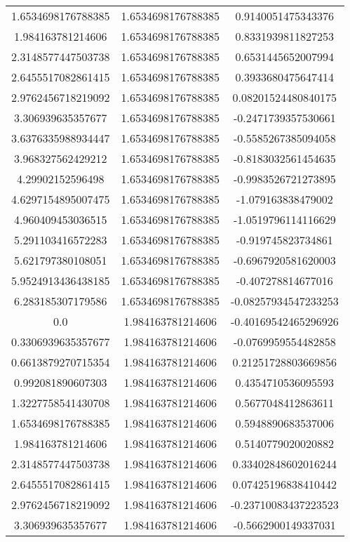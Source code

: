 \begin{table}
\begin{tabular}{ccc}
1.6534698176788385 & 1.6534698176788385 & 0.9140051475343376 \\
1.984163781214606 & 1.6534698176788385 & 0.8331939811827253 \\
2.3148577447503738 & 1.6534698176788385 & 0.6531445652007994 \\
2.6455517082861415 & 1.6534698176788385 & 0.3933680475647414 \\
2.9762456718219092 & 1.6534698176788385 & 0.08201524480840175 \\
3.306939635357677 & 1.6534698176788385 & -0.2471739357530661 \\
3.6376335988934447 & 1.6534698176788385 & -0.5585267385094058 \\
3.968327562429212 & 1.6534698176788385 & -0.8183032561454635 \\
4.29902152596498 & 1.6534698176788385 & -0.9983526721273895 \\
4.6297154895007475 & 1.6534698176788385 & -1.079163838479002 \\
4.960409453036515 & 1.6534698176788385 & -1.0519796114116629 \\
5.291103416572283 & 1.6534698176788385 & -0.919745823734861 \\
5.621797380108051 & 1.6534698176788385 & -0.6967920581620003 \\
5.9524913436438185 & 1.6534698176788385 & -0.407278814677016 \\
6.283185307179586 & 1.6534698176788385 & -0.08257934547233253 \\
0.0 & 1.984163781214606 & -0.40169542465296926 \\
0.3306939635357677 & 1.984163781214606 & -0.0769959554482858 \\
0.6613879270715354 & 1.984163781214606 & 0.21251728803669856 \\
0.992081890607303 & 1.984163781214606 & 0.4354710536095593 \\
1.3227758541430708 & 1.984163781214606 & 0.5677048412863611 \\
1.6534698176788385 & 1.984163781214606 & 0.5948890683537006 \\
1.984163781214606 & 1.984163781214606 & 0.5140779020020882 \\
2.3148577447503738 & 1.984163781214606 & 0.33402848602016244 \\
2.6455517082861415 & 1.984163781214606 & 0.07425196838410442 \\
2.9762456718219092 & 1.984163781214606 & -0.23710083437223523 \\
3.306939635357677 & 1.984163781214606 & -0.5662900149337031 \\

\end{tabular}
\end{table}
